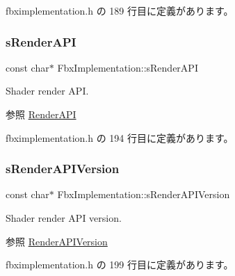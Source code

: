  fbximplementation.\+h の 189 行目に定義があります。

\mbox{\label{class_fbx_implementation_a6c5b03fd6433bbe70f3cd1868d52fdd1}} 
\subsubsection{\texorpdfstring{s\+Render\+A\+PI}{sRenderAPI}}
{\footnotesize\ttfamily const char$\ast$ Fbx\+Implementation\+::s\+Render\+A\+PI\hspace{0.3cm}{\ttfamily [static]}}

Shader render A\+PI. \begin{DoxySeeAlso}{参照}
\hyperlink{class_fbx_implementation_ac127174c10e30bdf28d2e276c7818302}{Render\+A\+PI} 
\end{DoxySeeAlso}


 fbximplementation.\+h の 194 行目に定義があります。

\mbox{\label{class_fbx_implementation_aa1ca5cd4df0e11b8f3df06eeb6650627}} 
\subsubsection{\texorpdfstring{s\+Render\+A\+P\+I\+Version}{sRenderAPIVersion}}
{\footnotesize\ttfamily const char$\ast$ Fbx\+Implementation\+::s\+Render\+A\+P\+I\+Version\hspace{0.3cm}{\ttfamily [static]}}

Shader render A\+PI version. \begin{DoxySeeAlso}{参照}
\hyperlink{class_fbx_implementation_a66ac67e482f39a4e71389f33f1c69648}{Render\+A\+P\+I\+Version} 
\end{DoxySeeAlso}


 fbximplementation.\+h の 199 行目に定義があります。

\mbox{\label{class_fbx_implementation_a9590713869bf7ee6b320ff49df12e5e5}} 

